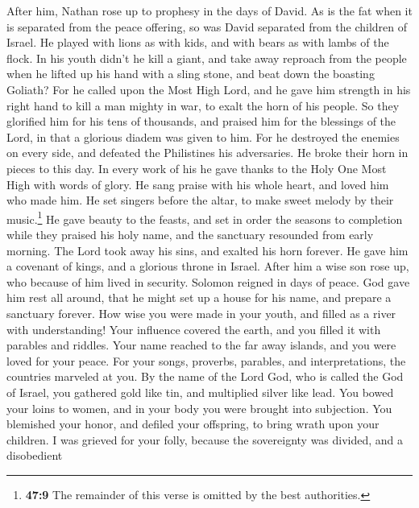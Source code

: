  After him, Nathan rose up to prophesy in the days of
David.  As is the fat when it is separated from the peace
offering, so was David separated from the children of Israel.
 He played with lions as with kids, and with bears as with
lambs of the flock.  In his youth didn't he kill a giant,
and take away reproach from the people when he lifted up his hand with a
sling stone, and beat down the boasting Goliath?  For he
called upon the Most High Lord, and he gave him strength in his right
hand to kill a man mighty in war, to exalt the horn of his people.
 So they glorified him for his tens of thousands, and
praised him for the blessings of the Lord, in that a glorious diadem was
given to him.  For he destroyed the enemies on every side,
and defeated the Philistines his adversaries. He broke their horn in
pieces to this day.  In every work of his he gave thanks
to the Holy One Most High with words of glory. He sang praise with his
whole heart, and loved him who made him.  He set singers
before the altar, to make sweet melody by their music.\footnote{\textbf{47:9}
  The remainder of this verse is omitted by the best authorities.}
 He gave beauty to the feasts, and set in order the
seasons to completion while they praised his holy name, and the
sanctuary resounded from early morning.  The Lord took
away his sins, and exalted his horn forever. He gave him a covenant of
kings, and a glorious throne in Israel.  After him a wise
son rose up, who because of him lived in security. 
Solomon reigned in days of peace. God gave him rest all around, that he
might set up a house for his name, and prepare a sanctuary forever.
 How wise you were made in your youth, and filled as a
river with understanding!  Your influence covered the
earth, and you filled it with parables and riddles.  Your
name reached to the far away islands, and you were loved for your peace.
 For your songs, proverbs, parables, and interpretations,
the countries marveled at you.  By the name of the Lord
God, who is called the God of Israel, you gathered gold like tin, and
multiplied silver like lead.  You bowed your loins to
women, and in your body you were brought into subjection.
 You blemished your honor, and defiled your offspring, to
bring wrath upon your children. I was grieved for your folly,
 because the sovereignty was divided, and a disobedient

